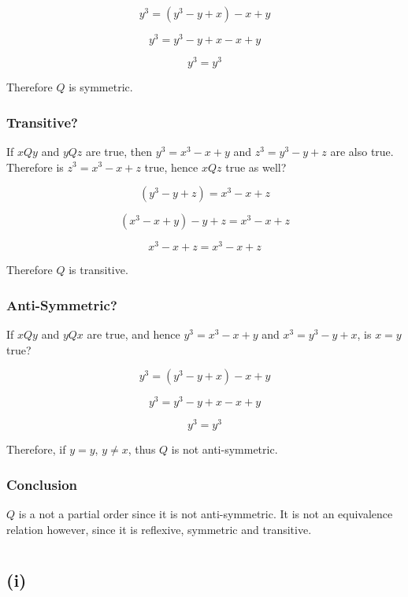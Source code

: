 \documentclass[a4paper,12pt]{article}
\begin{document}
\[ y^{3} = (y^{3} - y + x) - x + y \]

\[ y^{3} = y^{3} - y + x - x + y \]

\[ y^{3} = y^{3} \]

\noindent Therefore $Q$ is symmetric.

\subsubsection*{Transitive?}

\noindent If $xQy$ and $yQz$ are true, then $y^{3} = x^{3} - x + y$ and $z^{3} =
y^{3} - y + z$ are also true. Therefore is $z^{3} = x^{3} - x + z$ true,
hence $xQz$ true as well?

\[ (y^{3} - y + z) = x^{3} - x + z \]

\[ (x^{3} - x + y) - y + z = x^{3} - x + z \]

\[ x^{3} - x + z = x^{3} - x + z \]

\noindent Therefore $Q$ is transitive.

\subsubsection*{Anti-Symmetric?}

\noindent If $xQy$ and $yQx$ are true, and hence $y^{3} = x^{3} - x + y$ and
$x^{3} = y^{3} - y + x$, is $x = y$ true?

\[ y^{3} = (y^{3} - y + x) - x + y \]

\[ y^{3} = y^{3} - y + x - x + y \]

\[ y^{3} = y^{3} \]

\noindent Therefore, if $y = y$, $y \neq x$, thus $Q$ is not anti-symmetric.

\subsubsection*{Conclusion}

\noindent $Q$ is a not a partial order since it is not anti-symmetric. It is not an 
equivalence relation however, since it is reflexive, symmetric and
transitive.

\section{}

\subsection*{(i)}
\end{document}
